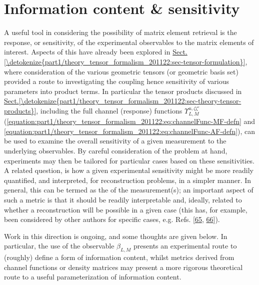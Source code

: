 \documentclass[letterpaper,table,10pt,english]{jupyterBook}
\begin{document}
\section{Information content \& sensitivity}
\label{\detokenize{part1/theory_info_content_221122:information-content-sensitivity}}\label{\detokenize{part1/theory_info_content_221122:sec-info-content}}\label{\detokenize{part1/theory_info_content_221122::doc}}
\sphinxAtStartPar
A useful tool in considering the possibility of matrix element retrieval is the response, or sensitivity, of the experimental observables to the matrix elements of interest. Aspects of this have already been explored in \hyperref[\detokenize{part1/theory_tensor_formalism_201122:sec-tensor-formulation}]{Sect.\@ \ref{\detokenize{part1/theory_tensor_formalism_201122:sec-tensor-formulation}}}, where consideration of the various geometric tensors (or geometric basis set) provided a route to investigating the coupling \sphinxhyphen{} hence sensitivity \sphinxhyphen{} of various parameters into product terms. In particular the tensor products discussed in \hyperref[\detokenize{part1/theory_tensor_formalism_201122:sec-theory-tensor-products}]{Sect.\@ \ref{\detokenize{part1/theory_tensor_formalism_201122:sec-theory-tensor-products}}}, including the full channel (response) functions \(\varUpsilon_{L,M}^{u,\zeta\zeta'}\) (\eqref{equation:part1/theory_tensor_formalism_201122:eq:channelFunc-MF-defn} and \eqref{equation:part1/theory_tensor_formalism_201122:eq:channelFunc-AF-defn}), can be used to examine the overall sensitivity of a given measurement to the underlying observables. By careful consideration of the problem at hand, experiments may then be tailored for particular cases based on these sensitivities. A related question, is how a given experimental sensitivity might be more readily quantified, and interpreted, for reconstruction problems, in a simpler manner. In general, this can be termed as the  of the measurement(s); an important aspect of such a metric is that it should be readily interpretable and, ideally, related to whether a reconstruction will be possible in a given case (this has, for example, been considered by other authors for specific cases, e.g. Refs. {[}\hyperlink{cite.backmatter/bibliography:id782}{65}, \hyperlink{cite.backmatter/bibliography:id748}{66}{]}).

\sphinxAtStartPar
Work in this direction is ongoing, and some thoughts are given below. In particular, the use of the observable \(\beta_{L,M}\) presents an experimental route to (roughly) define a form of information content, whilst metrics derived from channel functions or density matrices may present a more rigorous theoretical route to a useful parameterization of information content.
\end{document}

